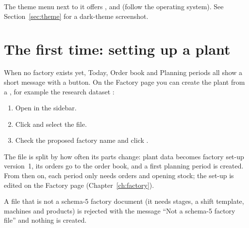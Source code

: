The theme menu next to it offers ,  and  (follow the operating system). See
Section~\ref{sec:theme} for a dark-theme screenshot.

\section{The first time: setting up a plant}\label{sec:first-setup}

When no factory exists yet, Today, Order book and Planning periods all show a short message with a
 button. On the Factory page you can create the plant from a , for example the research dataset :

\begin{steps}
\begin{enumerate}
  \item Open  in the sidebar.
  \item Click  and select the file.
  \item Check the proposed factory name and click .
\end{enumerate}
\end{steps}

The file is split by how often its parts change: plant data becomes factory set-up version~1, its orders go
to the order book, and a first planning period is created. From then on, each period only needs orders and
opening stock; the set-up is edited on the Factory page (Chapter~\ref{ch:factory}).

\begin{tip}
A file that is not a schema-5 factory document (it needs stages, a shift template, machines and products)
is rejected with the message ``Not a schema-5 factory file'' and nothing is created.
\end{tip}

